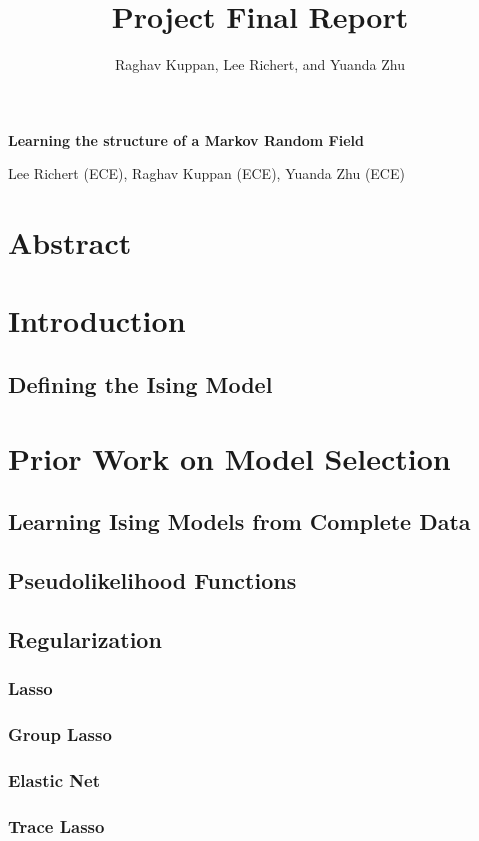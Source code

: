 \documentclass[11pt]{article}
\author{Raghav Kuppan, Lee Richert, and Yuanda Zhu}
\title{Project Final Report}
\begin{document}
\begin{center}
\textbf{\Large Learning the structure of a Markov Random Field}
\end{center}

\begin{center}
Lee Richert (ECE), Raghav Kuppan (ECE), Yuanda Zhu (ECE)
\end{center}



\section{Abstract}


\section{Introduction}

\subsection{Defining the Ising Model}

	

\section{Prior Work on Model Selection}
\subsection{Learning Ising Models from Complete Data}
\subsection{Pseudolikelihood Functions}
\subsection{Regularization}
\subsubsection{Lasso}
\subsubsection{Group Lasso}
\subsubsection{Elastic Net}
\subsubsection{Trace Lasso}
\end{document}
